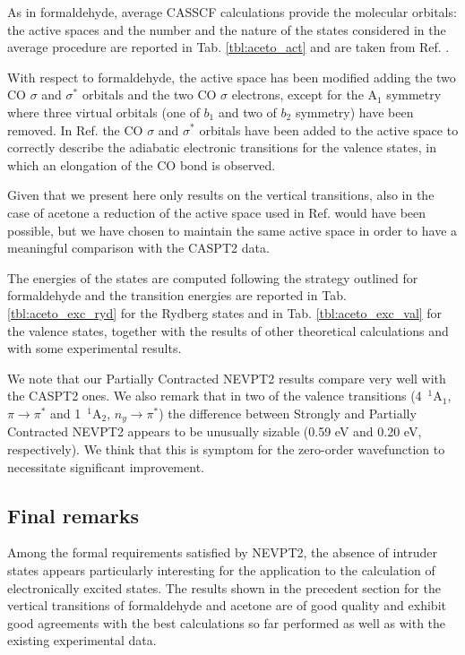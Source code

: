 As in formaldehyde, average CASSCF calculations provide the molecular
orbitals: the active spaces and the number and the nature of the states
considered in the average procedure are reported in Tab. \ref{tbl:aceto_act}
and are taken from Ref. . 

With respect to formaldehyde, the active space has been modified adding the
two CO $\sigma$ and $\sigma^*$ orbitals and the two CO $\sigma$ electrons,
except for the A$_1$ symmetry where three virtual orbitals (one of $b_1$ and
two of $b_2$ symmetry) have been removed. In Ref. 
the CO $\sigma$ and $\sigma^*$ orbitals have been added to the active space
to correctly describe the adiabatic electronic transitions for the
valence states, in which an elongation of the CO bond is observed.

Given that we present here only results on the vertical transitions, also in
the case of acetone a reduction of the active space used in Ref.
 would have been possible, but we have chosen to
maintain the same active space in order to have a meaningful comparison with
the CASPT2 data.



The energies of the states are computed following the strategy outlined for
formaldehyde and the transition energies are reported in Tab.
\ref{tbl:aceto_exc_ryd} for the Rydberg states and in Tab.
\ref{tbl:aceto_exc_val} for the valence states, together with the results of
other theoretical calculations and with some experimental results.

We note that our Partially Contracted NEVPT2 results compare very well with
the CASPT2 ones.  We also remark that in two of the valence transitions
(4~$^1$A$_1$, $\pi\rightarrow\pi^*$ and 1~$^1$A$_2$, $n_y\rightarrow\pi^*$)
the difference between Strongly and Partially Contracted NEVPT2 appears to be
unusually sizable (0.59 eV and 0.20 eV, respectively). We think that this is
symptom for the zero-order wavefunction to necessitate significant
improvement.





\subsection*{Final remarks}

Among the formal requirements satisfied by NEVPT2, the absence of intruder
states appears particularly interesting for the application to the
calculation of electronically excited states. The results shown in the
precedent section for the vertical transitions of formaldehyde and acetone
are of good quality and exhibit good agreements with the best calculations so
far performed as well as with the existing experimental data. 

